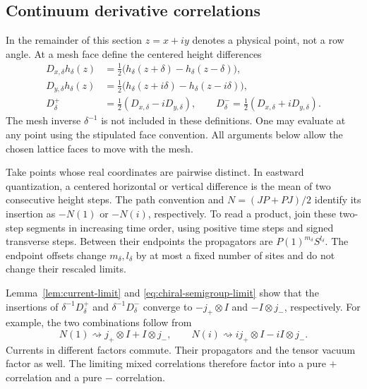 \subsection{Continuum derivative correlations}

In the remainder of this section $z=x+iy$ denotes a physical point, not
a row angle. At a mesh face define the centered height differences
\begin{align*}
 D_{x,\delta}h_\delta(z)
   &=\tfrac12\bigl(h_\delta(z+\delta)-h_\delta(z-\delta)\bigr),\\
 D_{y,\delta}h_\delta(z)
   &=\tfrac12\bigl(h_\delta(z+i\delta)-h_\delta(z-i\delta)\bigr),\\
 D_\delta^+&=\tfrac12(D_{x,\delta}-iD_{y,\delta}),\qquad
 D_\delta^-=\tfrac12(D_{x,\delta}+iD_{y,\delta}).
\end{align*}
The mesh inverse $\delta^{-1}$ is not included in these definitions.
One may evaluate at any point using the stipulated face convention.
All arguments below allow the chosen lattice faces to move with the mesh.

Take points whose real coordinates are pairwise distinct. In eastward
quantization, a centered horizontal or vertical difference is the mean of
two consecutive height steps. The path convention and $N=(JP+PJ)/2$
identify its insertion as $-N(1)$ or $-N(i)$, respectively. To read a
product, join these two-step segments in increasing time order, using
positive time steps and signed transverse steps. Between their endpoints
the propagators are $P(1)^{m_\delta}S^{l_\delta}$. The endpoint offsets
change $m_\delta,l_\delta$ by at most a fixed number of sites and do not
change their rescaled limits.

Lemma~\ref{lem:current-limit} and
\eqref{eq:chiral-semigroup-limit} show that the insertions of
$\delta^{-1}D_\delta^+$ and $\delta^{-1}D_\delta^-$ converge to
$-j_+\otimes I$ and $-I\otimes j_-$, respectively. For example,
the two combinations follow from
\[
 N(1)\rightsquigarrow j_+\otimes I+I\otimes j_-,
 \qquad
 N(i)\rightsquigarrow i j_+\otimes I-i I\otimes j_-.
\]
Currents in different factors commute. Their propagators and the tensor
vacuum factor as well. The limiting mixed correlations therefore factor
into a pure $+$ correlation and a pure $-$ correlation.

